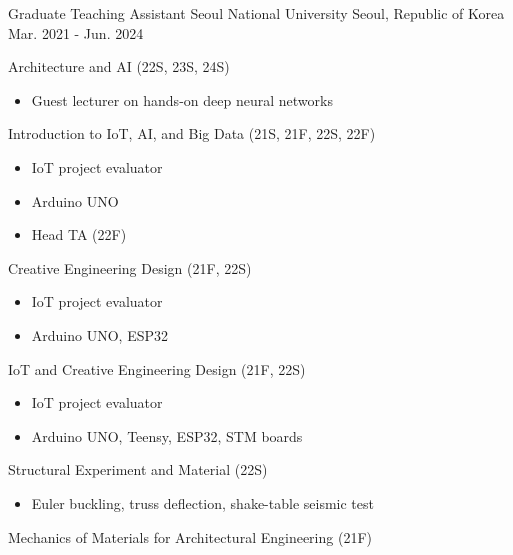 \begin{cventries}
  \cventrydivider

  \cventrycompact
  {Graduate Teaching Assistant}
  {Seoul National University}
  {Seoul, Republic of Korea}
  {Mar. 2021 - Jun. 2024}
  {
    \begin{cvitems}
      \item {Architecture and AI (22S, 23S, 24S)}
        \begin{itemize}[leftmargin=2.5ex, nosep, noitemsep]
          \setlength{\parskip}{0pt}
          \item {Guest lecturer on hands-on deep neural networks}
        \end{itemize}
      \item {Introduction to IoT, AI, and Big Data (21S, 21F, 22S, 22F)}
        \begin{itemize}[leftmargin=2.5ex, nosep, noitemsep]
          \setlength{\parskip}{0pt}
          \item {IoT project evaluator}
          \item {Arduino UNO}
          \item {Head TA (22F)}
        \end{itemize}
      \item {Creative Engineering Design (21F, 22S)}
        \begin{itemize}[leftmargin=2.5ex, nosep, noitemsep]
          \setlength{\parskip}{0pt}
          \item {IoT project evaluator}
          \item {Arduino UNO, ESP32}
        \end{itemize}
      \item {IoT and Creative Engineering Design (21F, 22S)}
        \begin{itemize}[leftmargin=2.5ex, nosep, noitemsep]
          \setlength{\parskip}{0pt}
          \item {IoT project evaluator}
          \item {Arduino UNO, Teensy, ESP32, STM boards}
        \end{itemize}
      \item {Structural Experiment and Material (22S)}
        \begin{itemize}[leftmargin=2.5ex, nosep, noitemsep]
          \setlength{\parskip}{0pt}
          \item {Euler buckling, truss deflection, shake-table seismic test}
        \end{itemize}
      \item {Mechanics of Materials for Architectural Engineering (21F)}

\end{cvitems}}
\end{cventries}
